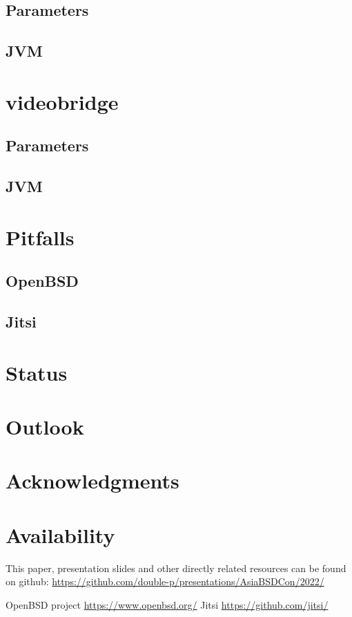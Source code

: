 \documentclass[conference]{IEEEtran}
\begin{document}
\subsection{Parameters}
\subsection{JVM}
\section{videobridge}
\subsection{Parameters}
\subsection{JVM}
\section{Pitfalls}
\subsection{OpenBSD}
\subsection{Jitsi}
\section{Status}
\section{Outlook}
\section{Acknowledgments}







\section{Availability}
This paper, presentation slides and other directly related resources can be found on github:
\url{https://github.com/double-p/presentations/AsiaBSDCon/2022/}


\begin{thebibliography}{00}
 OpenBSD project \url{https://www.openbsd.org/}
 Jitsi \url{https://github.com/jitsi/}

\end{thebibliography}
\end{document}
